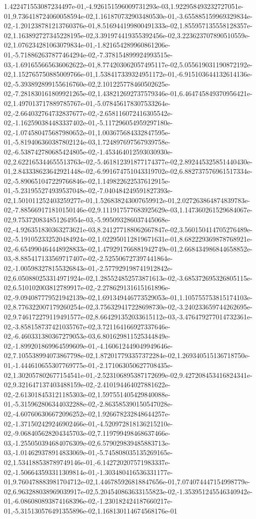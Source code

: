 1.422471553087234497e-01,-4.926151596009731293e-03,1.922958493232727051e-01,9.736418724060058594e-02,1.161870732903480530e-01,-3.655885159969329834e-02,-1.201238781213760376e-01,8.516944199800491333e-02,1.855957135558128357e-02,1.163892727345228195e-02,3.391974419355392456e-02,3.223623707890510559e-02,1.076234281063079834e-01,-1.821654289960861206e-01,-5.718862637877464294e-02,-7.378154899924993515e-03,-1.691655665636062622e-01,8.774203062057495117e-02,5.055619031190872192e-02,1.152765750885009766e-01,1.538417339324951172e-01,-6.915103644132614136e-02,-5.393892899155616760e-02,2.101225778460502625e-02,-7.281830161809921265e-02,1.438212692737579346e-01,6.464745849370956421e-02,1.497013717889785767e-01,-5.078456178307533264e-02,-2.664032764732837677e-02,-2.658116072416305542e-02,-1.162590384483337402e-01,-5.117296054959297180e-02,-1.074580475687980652e-01,1.003675684332847595e-01,-5.819406360387802124e-03,1.724897697567939758e-02,-6.538742780685424805e-02,-1.453464012593030930e-02,2.622165344655513763e-02,-5.461812391877174377e-02,2.892445325851440430e-01,2.843338623642921448e-02,-6.991674751043319702e-02,6.882737576961517334e-02,-5.890651047229766846e-02,1.149822622537612915e-01,-5.231955274939537048e-02,-7.040484249591827393e-02,1.501011252403259277e-01,1.526838243007659912e-01,2.027263864874839783e-02,-7.885669171810150146e-02,9.111917577683925629e-03,1.147360261529684067e-02,9.753720834851264954e-03,-5.995093286037445068e-02,-4.926351830363273621e-03,8.241277188062667847e-02,3.560150414705276489e-02,-5.191052332520484924e-02,1.022950112819671631e-01,8.682229369878768921e-02,-6.654990464448928833e-02,1.479291766881942749e-01,2.668434986844658852e-03,-8.885417133569717407e-02,-2.525506727397441864e-02,-1.005983278155326843e-01,-2.577929198741912842e-02,6.050880253314971924e-02,1.285524852573871613e-02,-3.685372695326805115e-02,6.510102003812789917e-02,-2.278629131615161896e-02,-9.094087779521942139e-02,1.691349446773529053e-01,1.105755753815174103e-02,8.776322007179260254e-02,3.756329417228698730e-02,-3.240233659744262695e-02,9.746172279119491577e-02,8.664291352033615112e-03,-3.476479277014732361e-02,-3.858158737421035767e-02,3.721164166927337646e-02,-6.460331380367279053e-03,6.801629811525344849e-02,-1.899201869964599609e-01,-4.160612449049949646e-02,7.105538994073867798e-02,1.872017793357372284e-02,1.269340515136718750e-01,-1.444610655307769775e-01,-2.171063050627708435e-02,1.302057802677154541e-01,-2.523106895387172699e-02,9.427208453416824341e-02,9.321647137403488159e-02,-2.410194464027881622e-02,-2.613018453121185303e-02,1.597551405429840088e-01,-5.315962806344032288e-02,-2.863585390150547028e-02,-4.607606306672096252e-02,1.926678232848644257e-02,-1.371502429246902466e-01,-4.520972818136215210e-02,-9.068405628204345703e-02,7.119799498468637466e-03,-1.255050394684076309e-02,6.579029839485883713e-03,-1.014629378914833069e-01,-5.745808035135269165e-02,1.534188538789749146e-01,-6.142720207571983337e-02,-1.506643593311309814e-01,-1.303480416536331177e-01,9.760478883981704712e-02,1.446785926818847656e-01,7.074074447154998779e-02,6.963288038969039917e-02,5.204540863633155823e-02,-1.353951245546340942e-01,-6.086080893874168396e-02,-1.230182424187660217e-01,-5.315130576491355896e-02,1.168130114674568176e-01
